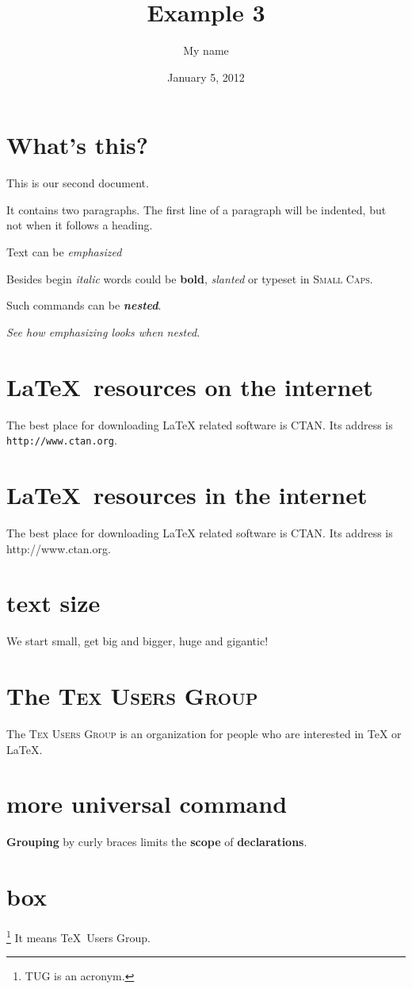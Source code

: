 \documentclass[a4paper,11pt]{article}
\newcommand{\TUG}{\textsc{Tex Users Group}\xspace}
\newcommand{\keyword}[1]{\textbf{#1}}
\begin{document}
	\title{Example 3}
	\author{My name}
	\date{January 5, 2012}
	\maketitle
	\section{What's this?}
	This	is    our
	second document.

	It contains two paragraphs. The first line of a paragraph will be
	indented, but not when it follows a heading.
	
	Text can be \emph{emphasized}

	Besides begin \textit{italic} words could be \textbf{bold},
	\textsl{slanted} or typeset in \textsc{Small Caps}.

	Such commands can be \textit{\textbf{nested}}.

	\emph{See how \emph{emphasizing} looks when nested.}
	\section{\textsf{\LaTeX\ resources on the internet}}
	The best place for downloading LaTeX related software is CTAN.
	Its address is \texttt{http://www.ctan.org}.
	\section{\sffamily\LaTeX\ resources in the internet}
	The best place for downloading LaTeX related software is CTAN.
	Its address is \ttfamily http://www.ctan.org\rmfamily.
	\section{text size}
	\noindent\tiny We \scriptsize start \footnotesize \small small,
	\normalsize get \large big \Large and \LARGE bigger, \huge huge
	and \Huge gigantic!
	\section{The \TUG}
	The \TUG is an organization for people who are interested in \TeX
	or \LaTeX.
	\section{more universal command}
	\keyword{Grouping} by curly braces limits the \keyword{scope} of
	\keyword{declarations}.
	\section{box}
	\parbox{3cm}{\footnote{TUG is an acronym.} It means \TeX\ Users Group.}
\end{document}
